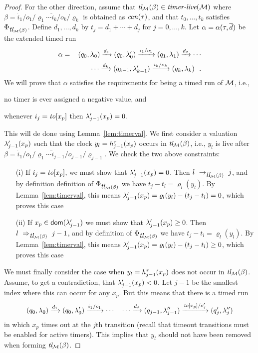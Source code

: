\begin{proof}
For the other direction,
assume  that $\mbox{\it tl}_{{\mathcal M}}({\beta})\in\mbox{\it timer-live}({{\mathcal M}})$ where
$\beta = {\hat{i}_1/o_1/\varrho_1}  \cdots {\hat{i}_k/o_k/\varrho_k}$ is
obtained as $\mathit{can}({\tau})$,
and that $t_0, \ldots, t_k$ satisfies $\Phi_{\mbox{\it tl}_{{\mathcal M}}({\beta})}$. 
Define 
$d_1, \ldots , d_k$ by $t_j = d_1 + \cdots + d_j$ for $j = 0 , \ldots, k$.
Let $\alpha =\alpha(\tau,\overline{d})$ be the extended timed run
\begin{eqnarray*}
\alpha & = & (q_0,\lambda_0) \xrightarrow{d_1} (q_0,\lambda_0') \xrightarrow{i_1/o_1} (q_1,\lambda_1) \xrightarrow{d_2} 
\cdots
\\ && \qquad \cdots
\xrightarrow{d_k} (q_{k-1},\lambda_{k-1}') \xrightarrow{i_k/o_k} (q_k,\lambda_k)
\ \ .
\end{eqnarray*}
We will prove that $\alpha$
satisfies the requirements for being a timed run of ${\mathcal M}$, i.e.,
  \begin{inparaenum}[(i)]
  \item no timer is ever assigned a negative value, and
  \item whenever $i_j = \mathit{to}[x_p]$ then $\lambda_{j-1}'(x_p) = 0$.
  \end{inparaenum}
  This will de done using Lemma~\ref{lem:timerval}. We first consider a
  valuation $\lambda_{j-1}'(x_p)$ such that the clock
  $y_l = h_{j-1}^{\tau}(x_p)$ occurs in $\mbox{\it tl}_{{\mathcal M}}({\beta})$,
  i.e., $y_l$ is live after $\beta = {\hat{i}_1/o_1/\varrho_1}  \cdots {\hat{i}_{j-1}/o_{j-1}/\varrho_{j-1}}$. We check the two above constraints:
\begin{itemize}
  \item[(i)] If $i_j = \mathit{to}[x_p]$, we must show
    that $\lambda_{j-1}'(x_p) = 0$. Then $l \ \rightarrow_{\mbox{\it tl}_{{\mathcal M}}({\beta})} \  j$, and by definition
    definition of     $\Phi_{\mbox{\it tl}_{{\mathcal M}}({\beta})}$ we have
    $t_j - t_l = \varrho_l(y_l)$.
   By Lemma~\ref{lem:timerval}, this means
   $\lambda_{j-1}'(x_p) = \varrho_l(y_l) - (t_j - t_l) = 0$, which proves
   this case
\item[(ii)] If $x_p \in {\textsf{dom}}(\lambda_{j-1}')$ we must show
    that $\lambda_{j-1}'(x_p) \geq 0$. 
Then $l \ \Rightarrow_{\mbox{\it tl}_{{\mathcal M}}({\beta})}\  {j-1}$, and by
    definition of     $\Phi_{\mbox{\it tl}_{{\mathcal M}}({\beta})}$ we have
    $t_j - t_l = \varrho_l(y_l)$.
   By Lemma~\ref{lem:timerval}, this means
   $\lambda_{j-1}'(x_p) = \varrho_l(y_l) - (t_j - t_l) \geq 0$, which proves
   this case
\end{itemize}
   We must finally consider the case when
   $y_l = h_{j-1}^{\tau}(x_p)$ does not occur in $\mbox{\it tl}_{{\mathcal M}}({\beta})$.
   Assume, to get a contradiction, that $\lambda_{j-1}'(x_p) < 0$.
   Let $j-1$ be the smallest index where this can occur for any $x_p$. But
   this means that there is a timed run
\[
(q_0,\lambda_0) \xrightarrow{d_1} (q_0,\lambda_0') \xrightarrow{i_1/o_1}
\cdots \quad \cdots
\xrightarrow{d_j} (q_{j-1},\lambda_{j-1}'') \xrightarrow{\mathit{to}[x_p]/o_j'} (q_j',\lambda_j'')
\]
in which $x_p$ times out at the $j$th transition
(recall that timeout transitions must be enabled for active timers).
This implies that $y_l$ should not have been removed when forming
$\mbox{\it tl}_{{\mathcal M}}({\beta})$.
\end{proof}

